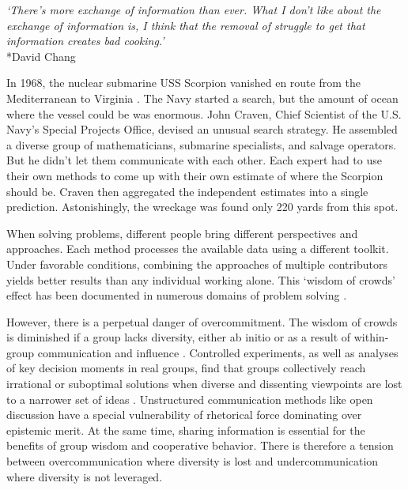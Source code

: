 \documentclass[12pt]{article}
\begin{document}
\begin{center}
\textit{`There's more exchange of information than ever. What I don't like about the exchange of information is, I think that the removal of struggle to get that information creates bad cooking.'}\\*David Chang
\end{center}


In 1968, the nuclear submarine USS Scorpion vanished en route from the Mediterranean to Virginia \citep{sontag1998blind, craven2002silent, surowiecki2005wisdom}. The Navy started a search, but the amount of ocean where the vessel could be was enormous. John Craven, Chief Scientist of the U.S. Navy's Special Projects Office, devised an unusual search strategy. He assembled a diverse group of mathematicians, submarine specialists, and salvage operators. But he didn't let them communicate with each other. Each expert had to use their own methods to come up with their own estimate of where the Scorpion should be. Craven then aggregated the independent estimates into a single prediction. Astonishingly, the wreckage was found only 220 yards from this spot. 

When solving problems, different people bring different perspectives and approaches. Each method processes the available data using a different toolkit. Under favorable conditions, combining the approaches of multiple contributors yields better results than any individual working alone. This `wisdom of crowds' effect has been documented in numerous domains of problem solving \citep{surowiecki2005wisdom, condorcet1785essai}.

However, there is a perpetual danger of overcommitment. The wisdom of crowds is diminished if a group lacks diversity, either ab initio or as a result of within-group communication and influence \citep{surowiecki2005wisdom, hogarth1978note, ladha1992condorcet, hong2004groups}. Controlled experiments, as well as analyses of key decision moments in real groups, find that groups collectively reach irrational or suboptimal solutions when diverse and dissenting viewpoints are lost to a narrower set of ideas \citep{anderson1997information, stasser1985pooling, flowers1977laboratory, becker2017network, janis1972victims, bernstein2018intermittent, diehl1987productivity, frey2021social}. Unstructured communication methods like open discussion have a special vulnerability of rhetorical force dominating over epistemic merit. At the same time, sharing information is essential for the benefits of group wisdom and cooperative behavior. There is therefore a tension between overcommunication where diversity is lost and undercommunication where diversity is not leveraged. 
\end{document}
